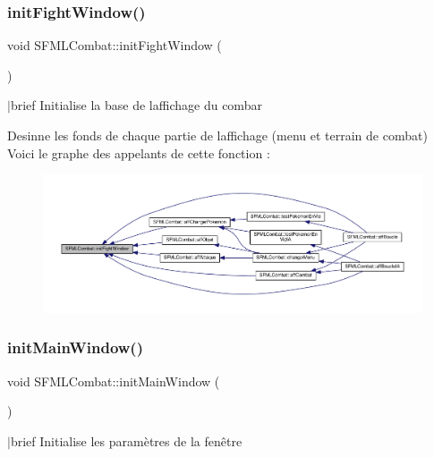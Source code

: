 \subsubsection{\texorpdfstring{init\+Fight\+Window()}{initFightWindow()}}
{\footnotesize\ttfamily void S\+F\+M\+L\+Combat\+::init\+Fight\+Window (\begin{DoxyParamCaption}{ }\end{DoxyParamCaption})\hspace{0.3cm}{\ttfamily [private]}}

$\vert$brief Initialise la base de l\textquotesingle{}affichage du combar

Desinne les fonds de chaque partie de l\textquotesingle{}affichage (menu et terrain de combat) Voici le graphe des appelants de cette fonction \+:\nopagebreak
\begin{figure}[H]
\begin{center}
\leavevmode
\includegraphics[width=350pt]{class_s_f_m_l_combat_a5d363c2d06e7f0505990bf12866d0595_icgraph}
\end{center}
\end{figure}
\mbox{\label{class_s_f_m_l_combat_a9d307eb8a3289a694486f30b56ca402d}} 
\subsubsection{\texorpdfstring{init\+Main\+Window()}{initMainWindow()}}
{\footnotesize\ttfamily void S\+F\+M\+L\+Combat\+::init\+Main\+Window (\begin{DoxyParamCaption}{ }\end{DoxyParamCaption})\hspace{0.3cm}{\ttfamily [private]}}

$\vert$brief Initialise les paramètres de la fenêtre

